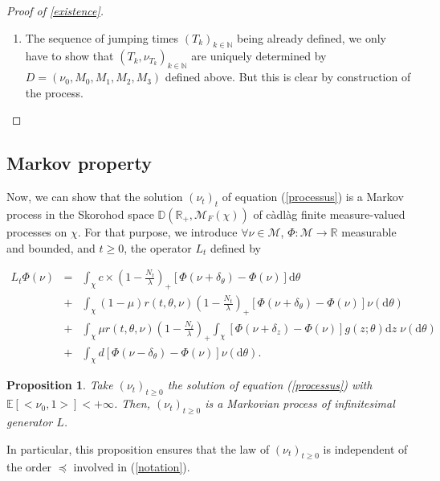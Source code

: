 \documentclass[a4paper,11pt]{article}
\newtheorem{prop}[theo]{Proposition}
\newcommand{\R}{\mathbb{R}}
\newcommand{\dx}{\textrm{d}}
\begin{document}
\begin{proof}[Proof of \ref{existence}]
\begin{enumerate}
\begin{itemize}
Then, $\forall \omega \in B$, $(T_k(\omega))_k$ can be seen as the subsequence of a sequence of jumping times $(T_k^1(\omega))_k$ of a Point Poisson Process of intensity $c + (\overline{r}+d)N'$. The only accumulation point of $(T_k^1(\omega))_k$ being $\mathbb{P}-a.s \; +\infty$, it contradicts the definition of $B$, and proves (\ref{assertion1}). 
\end{itemize}

\item The sequence of jumping times $(T_k)_{k\in \mathbb{N}}$ being already defined, we only have to show that $(T_k,\nu_{T_k})_{k\in \mathbb{N}}$ are uniquely determined by $D=(\nu_0,M_0,M_1,M_2,M_3)$ defined above.
But this is clear by construction of the process. 
\end{enumerate}
\end{proof}

\subsection{Markov property}

Now, we can show that the solution $(\nu_t)_t$ of equation (\ref{processus}) is a Markov process  in the Skorohod space $\mathbb{D}(\R_+,\mathcal{M}_F(\chi))$ of càdlàg finite measure-valued processes on $\chi$. For that purpose, we introduce $\forall \nu\in \mathcal{M}$, $\Phi: \mathcal{M} \rightarrow \mathbb{R}$ measurable and bounded, and $t\geq 0$, the operator $L_t$ defined by 

\begin{eqnarray}\label{generator}
L_t\Phi(\nu) &=& \int_{\chi} c\times (1-\frac{N_t}{\lambda})_+ \left[ \Phi(\nu + \delta_{\theta}) - \Phi(\nu) \right] \dx \theta \nonumber\\
&+& \int_{\chi} (1- \mu) r(t,\theta, \nu)(1-\frac{N_t}{\lambda})_+  \left[ \Phi(\nu + \delta_{\theta}) - \Phi(\nu) \right] \nu(\dx \theta) \\
&+& \int_{\chi} \mu r(t,\theta,\nu)(1-\frac{N_t}{\lambda})_+  \int_{\chi} \left[ \Phi(\nu + \delta_{z}) - \Phi(\nu) \right] g(z; \theta) \dx z \; \nu(\dx \theta)\nonumber\\
&+& \int_{\chi} d \left[\Phi(\nu - \delta_{\theta}) - \Phi(\nu) \right] \nu(\dx \theta). \nonumber 
\end{eqnarray}


\begin{prop}\label{markovprop}
 Take $(\nu_t)_{t\geq 0}$ the solution of equation (\ref{processus}) with $\mathbb{E}[<\nu_0,1>]<+\infty$. Then, $(\nu_t)_{t\geq 0}$ is a Markovian process of infinitesimal generator $L$.
\end{prop}
In particular, this proposition ensures that the law of $(\nu_t)_{t\geq 0}$ is independent of the order $\preceq$ involved in (\ref{notation}).
\end{document}
